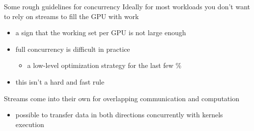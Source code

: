 \begin{frame}[fragile]{}
    \begin{info}{Some rough guidelines for concurrency}
        Ideally for most workloads you don't want to rely on streams to fill the GPU with work
        \begin{itemize}
            \item a sign that the working set per GPU is not large enough
            \item full concurrency is difficult in practice
            \begin{itemize}
                \item a low-level optimization strategy for the last few \%
            \end{itemize}
            \item this isn't a hard and fast rule
        \end{itemize}

        Streams come into their own for overlapping communication and computation
        \begin{itemize}
            \item possible to transfer data in both directions concurrently with kernels execution
        \end{itemize}
    \end{info}
\end{frame}

